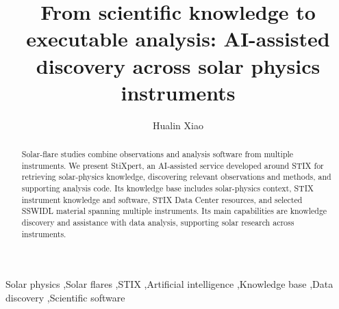 \documentclass[preprint,12pt]{elsarticle}
\begin{document}
\begin{frontmatter}

  \title{From scientific knowledge to executable analysis: AI-assisted discovery across solar physics instruments}

  \author[inst1,inst2]{Hualin Xiao}

  \address[inst1]{University of Applied Sciences and Arts Northwestern
    Switzerland (FHNW), Switzerland}
  \address[inst2]{Physikalisch-Meteorologisches Observatorium Davos/World
    Radiation Center (PMOD/WRC), Davos, Switzerland}

  \begin{abstract}
    Solar-flare studies combine observations and analysis software from multiple
    instruments.
    We present StiXpert, an AI-assisted service developed around STIX for retrieving
    solar-physics knowledge, discovering relevant observations and methods, and
    supporting analysis code.
    Its knowledge base includes solar-physics context, STIX instrument knowledge and
    software, STIX Data Center resources, and selected SSWIDL material spanning multiple
    instruments.
    Its main capabilities are knowledge discovery and assistance with data analysis,
    supporting solar research across instruments.
  \end{abstract}

  \begin{keyword}
    Solar physics \sep Solar flares \sep STIX \sep Artificial intelligence
    \sep Knowledge base \sep Data discovery \sep Scientific software
  \end{keyword}

\end{frontmatter}





\end{document}

